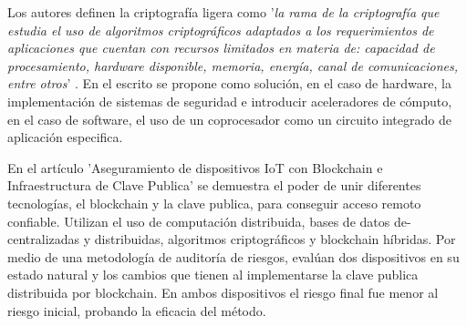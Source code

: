 \documentclass{article}
\begin{document}
        Los autores definen la criptografía ligera como '\textit{la rama de la criptografía que estudia el uso de algoritmos criptográficos adaptados a los requerimientos de aplicaciones que cuentan con recursos limitados en materia de: capacidad de procesamiento, hardware disponible, memoria, energía, canal de comunicaciones, entre otros}' \cite{criptografia_ligera}.
        En el escrito se propone como solución, en el caso de hardware, la implementación de sistemas de seguridad e introducir aceleradores de cómputo, en el caso de software, el uso  de un coprocesador como un circuito integrado de aplicación especifica.

        En el artículo 'Aseguramiento de dispositivos IoT con Blockchain e Infraestructura de Clave Publica' se demuestra el poder de unir diferentes tecnologías, el blockchain y la clave publica, para conseguir acceso remoto confiable. Utilizan el uso de computación distribuida, bases de datos de-centralizadas y distribuidas, algoritmos criptográficos y blockchain híbridas. Por medio de una metodología de auditoría de riesgos, evalúan dos dispositivos en su estado natural y los cambios que tienen al implementarse la clave publica distribuida por blockchain. En ambos dispositivos el riesgo final fue menor al riesgo inicial, probando la eficacia del método.
\end{document}
